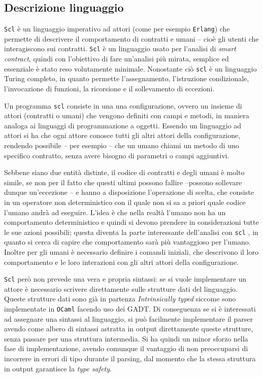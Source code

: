 \documentclass[]{article}
\begin{document}
\hypertarget{descrizione-linguaggio}{%
\subsection{Descrizione linguaggio}\label{descrizione-linguaggio}}

\texttt{Scl} è un linguaggio imperativo ad attori (come per esempio
\texttt{Erlang}) che permette di descrivere il comportamento di
contratti e umani -- cioè gli utenti che interagiscono sui contratti.
\texttt{Scl} è un linguaggio usato per l'analisi di \emph{smart
contract}, quindi con l'obiettivo di fare un'analisi più mirata,
semplice ed essenziale è stato reso volutamente minimale. Nonostante ciò
\texttt{scl} è un linguaggio Turing completo, in quanto permette
l'assegnamento, l'istruzione condizionale, l'invocazione di funzioni, la
ricorsione e il sollevamento di eccezioni.

Un programma \texttt{scl} consiste in una una configurazione, ovvero un
insieme di attori (contratti o umani) che vengono definiti con campi e
metodi, in maniera analoga ai linguaggi di programmazione a oggetti.
Essendo un linguaggio ad attori si ha che ogni attore conosce tutti gli
altri attori della configurazione, rendendo possibile -- per esempio --
che un umano chiami un metodo di uno specifico contratto, senza avere
bisogno di parametri o campi aggiuntivi.

Sebbene siano due entità distinte, il codice di contratti e degli umani
è molto simile, se non per il fatto che questi ultimi possono fallire
--possono sollevare dunque un'eccezione -- e hanno a disposizione
l'operazione di scelta, che consiste in un operatore non deterministico
con il quale non si sa a priori quale codice l'umano andrà ad eseguire.
L'idea è che nella realtà l'umano non ha un comportamento deterministico
e quindi si devono prendere in considerazioni tutte le sue azioni
possibili; questa diventa la parte interessante dell'analisi con
\texttt{scl} , in quanto si cerca di capire che comportamento sarà più
vantaggioso per l'umano. Inoltre per gli umani è necessario definire i
comandi iniziali, che descrivono il loro comportamento e le loro
interazioni con gli altri attori della configurazione.

\texttt{Scl} però non prevede una vera e propria sintassi: se si vuole
implementare un attore è necessario scrivere direttamente sulle
strutture dati del linguaggio. Queste strutture dati sono già in
partenza \emph{Intrinsically typed} siccome sono implementate in
\texttt{OCaml} facendo uso dei GADT. Di conseguenza se si è interessati
ad assegnare una sintassi al linguaggio, si può facilmente implementare
il parser avendo come albero di sintassi astratta in output direttamente
queste strutture, senza passare per una struttura intermedia. Si ha
quindi un minor sforzo nella fase di implementazione, avendo comunque il
vantaggio di non preoccuparsi di incorrere in errori di tipo durante il
parsing, dal momento che la stessa struttura in output garantisce la
\emph{type safety}.
\end{document}
